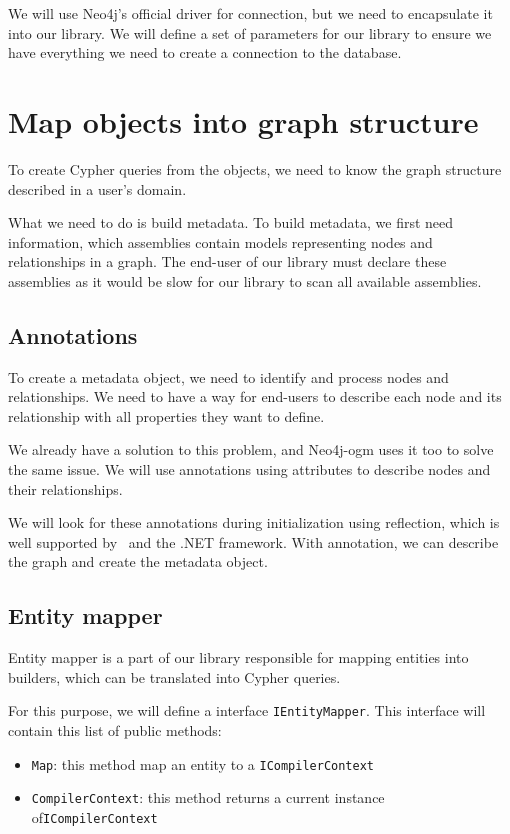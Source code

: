 We will use Neo4j's official driver for connection, but we need to encapsulate it into our library.
We will define a set of parameters for our library to ensure we have everything we need to create a connection to the database.

\section {Map objects into graph structure}

To create Cypher queries from the objects, we need to know the graph structure described in a user's domain.

What we need to do is build metadata.
To build metadata, we first need information, which assemblies contain models representing nodes and relationships in a graph.
The end-user of our library must declare these assemblies as it would be slow for our library to scan all available assemblies.

\subsection {Annotations}

To create a metadata object, we need to identify and process nodes and relationships.
We need to have a way for end-users to describe each node and its relationship with all properties they want to define.

We already have a solution to this problem, and Neo4j-\acrshort{ogm} uses it too to solve the same issue.
We will use annotations using attributes to describe nodes and their relationships.

We will look for these annotations during initialization using reflection, which is well supported by \CS\ and the .NET framework.
With annotation, we can describe the graph and create the metadata object.

\subsection {Entity mapper}

Entity mapper is a part of our library responsible for mapping entities into builders, which can be translated into Cypher queries.

For this purpose, we will define a interface \texttt{IEntityMapper}. This interface will contain
this list of public methods:

\begin{itemize}
    \item {\texttt{Map}: this method map an entity to a \texttt{ICompilerContext}}
    \item {\texttt{CompilerContext}: this method returns a current instance of\linebreak \texttt{ICompilerContext}}
\end{itemize}


